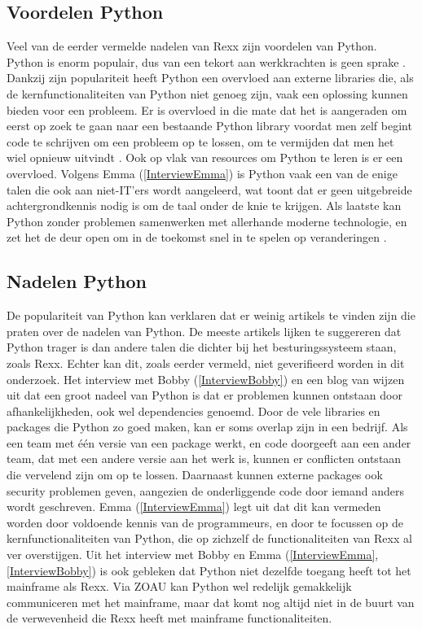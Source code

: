 \subsection{Voordelen Python}
Veel van de eerder vermelde nadelen van Rexx zijn voordelen van Python. Python is enorm populair, dus van een tekort aan werkkrachten is geen sprake \autocite{Sanglier2022}. Dankzij zijn populariteit heeft Python een overvloed aan externe libraries die, als de kernfunctionaliteiten van Python niet genoeg zijn, vaak een oplossing kunnen bieden voor een probleem. Er is overvloed in die mate dat het is aangeraden om eerst op zoek te gaan naar een bestaande Python library voordat men zelf begint code te schrijven om een probleem op te lossen, om te vermijden dat men het wiel opnieuw uitvindt \autocite{Lindstrom2005}. Ook op vlak van resources om Python te leren is er een overvloed. Volgens Emma (\ref{InterviewEmma}) is Python vaak een van de enige talen die ook aan niet-IT’ers wordt aangeleerd, wat toont dat er geen uitgebreide achtergrondkennis nodig is om de taal onder de knie te krijgen. Als laatste kan Python zonder problemen samenwerken met allerhande moderne technologie, en zet het de deur open om in de toekomst snel in te spelen op veranderingen \autocite{Gilio2021}.

\subsection{Nadelen Python}
De populariteit van Python kan verklaren dat er weinig artikels te vinden zijn die praten over de nadelen van Python. De meeste artikels lijken te suggereren dat Python trager is dan andere talen die dichter bij het besturingssysteem staan, zoals Rexx. Echter kan dit, zoals eerder vermeld, niet geverifieerd worden in dit onderzoek. Het interview met Bobby (\ref{InterviewBobby}) en een blog van \textcite{Redwerk2024} wijzen uit dat een groot nadeel van Python is dat er problemen kunnen ontstaan door afhankelijkheden, ook wel dependencies genoemd. Door de vele libraries en packages die Python zo goed maken, kan er soms overlap zijn in een bedrijf. Als een team met één versie van een package werkt, en code doorgeeft aan een ander team, dat met een andere versie aan het werk is, kunnen er conflicten ontstaan die vervelend zijn om op te lossen. Daarnaast kunnen externe packages ook security problemen geven, aangezien de onderliggende code door iemand anders wordt geschreven. Emma (\ref{InterviewEmma}) legt uit dat dit kan vermeden worden door voldoende kennis van de programmeurs, en door te focussen op de kernfunctionaliteiten van Python, die op zichzelf de functionaliteiten van Rexx al ver overstijgen. Uit het interview met Bobby en Emma (\ref{InterviewEmma},\ref{InterviewBobby}) is ook gebleken dat Python niet dezelfde toegang heeft tot het mainframe als Rexx. Via ZOAU kan Python wel redelijk gemakkelijk communiceren met het mainframe, maar dat komt nog altijd niet in de buurt van de verwevenheid die Rexx heeft met mainframe functionaliteiten.

